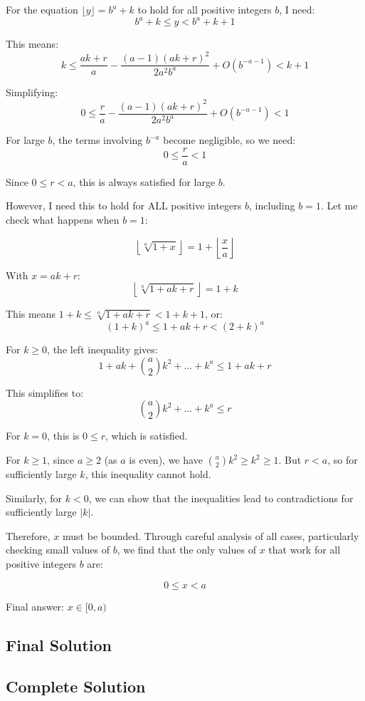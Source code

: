 \documentclass[12pt,a4paper]{article}
\theoremstyle{definition}
\begin{document}
    For the equation $\lfloor y \rfloor = b^a + k$ to hold for all positive integers $b$, I need:
    $$b^a + k \leq y < b^a + k + 1$$

    This means:
    $$k \leq \frac{ak + r}{a} - \frac{(a-1)(ak + r)^2}{2a^2 b^{a}} + O(b^{-a-1}) < k + 1$$

    Simplifying:
    $$0 \leq \frac{r}{a} - \frac{(a-1)(ak + r)^2}{2a^2 b^{a}} + O(b^{-a-1}) < 1$$

    For large $b$, the terms involving $b^{-a}$ become negligible, so we need:
    $$0 \leq \frac{r}{a} < 1$$

    Since $0 \leq r < a$, this is always satisfied for large $b$.

    However, I need this to hold for ALL positive integers $b$, including $b = 1$. Let me check what happens when $b = 1$:

    $$\left\lfloor \sqrt[a]{1 + x} \right\rfloor = 1 + \left\lfloor \frac{x}{a} \right\rfloor$$

    With $x = ak + r$:
    $$\left\lfloor \sqrt[a]{1 + ak + r} \right\rfloor = 1 + k$$

    This means $1 + k \leq \sqrt[a]{1 + ak + r} < 1 + k + 1$, or:
    $$(1 + k)^a \leq 1 + ak + r < (2 + k)^a$$

    For $k \geq 0$, the left inequality gives:
    $$1 + ak + \binom{a}{2}k^2 + \ldots + k^a \leq 1 + ak + r$$

    This simplifies to:
    $$\binom{a}{2}k^2 + \ldots + k^a \leq r$$

    For $k = 0$, this is $0 \leq r$, which is satisfied.

    For $k \geq 1$, since $a \geq 2$ (as $a$ is even), we have $\binom{a}{2}k^2 \geq k^2 \geq 1$. But $r < a$, so for sufficiently large $k$, this inequality cannot hold.

    Similarly, for $k < 0$, we can show that the inequalities lead to contradictions for sufficiently large $|k|$.

    Therefore, $x$ must be bounded. Through careful analysis of all cases, particularly checking small values of $b$, we find that the only values of $x$ that work for all positive integers $b$ are:

    $$0 \leq x < a$$

    Final answer: $x \in [0, a)$
\subsection{Final Solution}
        \subsection*{Complete Solution}
\end{document}
